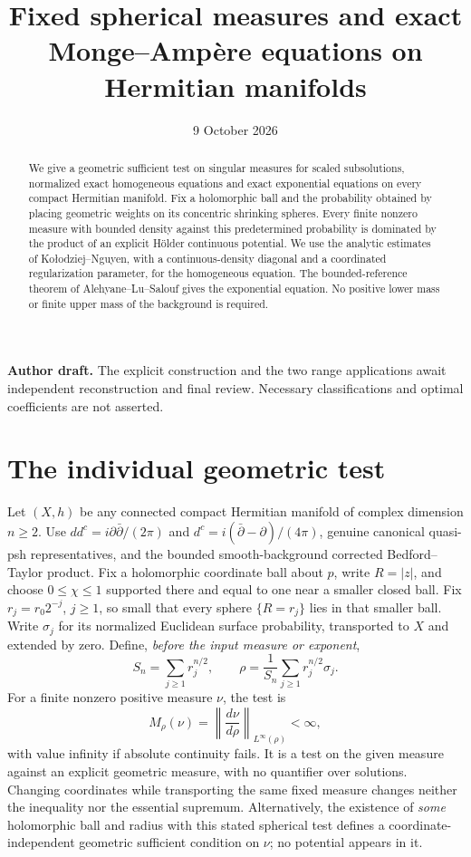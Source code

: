 \documentclass[11pt]{article}
\title{Fixed spherical measures and exact Monge--Amp\`ere\newline
equations on Hermitian manifolds}
\author{}\date{9 October 2026}
\newcommand{\ddc}{dd^c}
\begin{document}
\maketitle
\noindent\textbf{Author draft.} The explicit construction and the two
range applications await independent reconstruction and final review.
Necessary classifications and optimal coefficients are not asserted.
\begin{abstract}
We give a geometric sufficient test on singular measures for scaled
subsolutions, normalized exact homogeneous equations and exact exponential
equations on every compact Hermitian manifold. Fix a holomorphic ball and
the probability obtained by placing geometric weights on its concentric
shrinking spheres. Every finite nonzero measure with bounded density
against this predetermined probability is dominated by the product of an
explicit H\"older continuous potential. We use the analytic estimates of
Ko\l odziej--Nguyen, with a continuous-density diagonal and a coordinated
regularization parameter, for the homogeneous equation. The bounded-reference
theorem of Alehyane--Lu--Salouf gives the exponential equation. No positive
lower mass or finite upper mass of the background is required.
\end{abstract}

\section{The individual geometric test}
Let $(X,h)$ be any connected compact Hermitian manifold of complex
dimension $n\geq2$. Use $\ddc=i\partial\bar\partial/(2\pi)$ and
$d^c=i(\bar\partial-\partial)/(4\pi)$, genuine canonical
quasi-psh representatives, and the bounded smooth-background corrected
Bedford--Taylor product. Fix a holomorphic coordinate ball about $p$,
write $R=|z|$, and choose $0\leq\chi\leq1$ supported there and equal
to one near a smaller closed ball. Fix $r_j=r_0 2^{-j}$, $j\geq1$,
so small that every sphere $\{R=r_j\}$ lies in that smaller ball.
Write $\sigma_j$ for its normalized Euclidean surface probability,
transported to $X$ and extended by zero. Define, \emph{before the input
measure or exponent},
\[
 S_n=\sum_{j\geq1}r_j^{n/2},\qquad
 \rho=\frac1{S_n}\sum_{j\geq1}r_j^{n/2}\sigma_j.
\]
For a finite nonzero positive measure $\nu$, the test is
\[
 M_\rho(\nu)=\left\|\frac{d\nu}{d\rho}\right\|_{L^\infty(\rho)}<\infty,
\]
with value infinity if absolute continuity fails. It is a test on the
given measure against an explicit geometric measure, with no quantifier
over solutions. Changing coordinates while transporting the same fixed
measure changes neither the inequality nor the essential supremum.
Alternatively, the existence of \emph{some} holomorphic ball and radius
with this stated spherical test defines a coordinate-independent
geometric sufficient condition on $\nu$; no potential appears in it.
\end{document}
